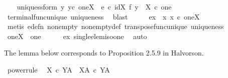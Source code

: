 \begin{isabellebody}
\ \ \isamarkupfalse%
\ uniquess{\isacharunderscore}{\kern0pt}form{\isacharcolon}{\kern0pt}\ {\isachardoublequoteopen}{\isasymforall}y{\isachardot}{\kern0pt}\ {\isacharparenleft}{\kern0pt}y{\isasymin}\isactrlsub c\ one\isactrlbsup X\isactrlesup \ {\isasymlongrightarrow}\ e\ {\isasymcirc}\isactrlsub c\ {\isacharparenleft}{\kern0pt}id{\isacharparenleft}{\kern0pt}X{\isacharparenright}{\kern0pt}\ {\isasymtimes}\isactrlsub f\ y{\isacharparenright}{\kern0pt}\ {\isacharequal}{\kern0pt}\ {\isasymbeta}\isactrlbsub X\ {\isasymtimes}\isactrlsub c\ one\isactrlesub {\isacharparenright}{\kern0pt}{\isachardoublequoteclose}\isanewline
\ \ \ \ \isamarkupfalse%
\ terminal{\isacharunderscore}{\kern0pt}func{\isacharunderscore}{\kern0pt}unique\ uniqueness\ \isamarkupfalse%
\ blast\isanewline
\ \ \isamarkupfalse%
\ \isamarkupfalse%
\ ex{}{\isacharcolon}{\kern0pt}\ {\isachardoublequoteopen}{\isacharparenleft}{\kern0pt}{\isasymexists}{\isacharbang}{\kern0pt}\ x{\isachardot}{\kern0pt}\ x\ {\isasymin}\isactrlsub c\ one\isactrlbsup X\isactrlesup {\isacharparenright}{\kern0pt}{\isachardoublequoteclose}\isanewline
\ \ \ \ \isamarkupfalse%
\ {\isacharparenleft}{\kern0pt}metis\ e{\isacharunderscore}{\kern0pt}defn\ nonempty\ nonempty{\isacharunderscore}{\kern0pt}def\ transpose{\isacharunderscore}{\kern0pt}func{\isacharunderscore}{\kern0pt}unique\ uniqueness{\isacharparenright}{\kern0pt}\isanewline
\ \ \isamarkupfalse%
\ {\isachardoublequoteopen}one\isactrlbsup X\isactrlesup \ {\isasymcong}\ one{\isachardoublequoteclose}\isanewline
\ \ \ \ \isamarkupfalse%
\ ex{}\ single{\isacharunderscore}{\kern0pt}elem{\isacharunderscore}{\kern0pt}iso{\isacharunderscore}{\kern0pt}one\ \isamarkupfalse%
\ auto\isanewline
{}\isamarkupfalse%
%
\endisatagproof
{\isafoldproof}%
%
\isadelimproof
%
\endisadelimproof
%
\begin{isamarkuptext}%
The lemma below corresponds to Proposition 2.5.9 in Halvorson.%
\end{isamarkuptext}\isamarkuptrue%
\isamarkupfalse%
\ power{\isacharunderscore}{\kern0pt}rule{\isacharcolon}{\kern0pt}\isanewline
\ \ {\isachardoublequoteopen}{\isacharparenleft}{\kern0pt}X\ {\isasymtimes}\isactrlsub c\ Y{\isacharparenright}{\kern0pt}\isactrlbsup A\isactrlesup \ {\isasymcong}\ X\isactrlbsup A\isactrlesup \ {\isasymtimes}\isactrlsub c\ Y\isactrlbsup A\isactrlesup {\isachardoublequoteclose}\isanewline
%
\isadelimproof

\end{isabellebody}
